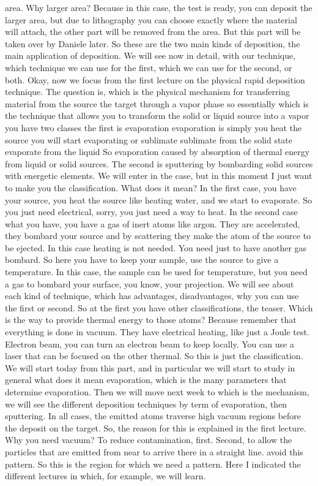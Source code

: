 area. Why larger area? Because in this case, the test is ready, you can deposit the larger area, but due to lithography you can choose exactly where the material will attach, the other part will be removed from the area. But this part will be taken over by Daniele later. So these are the two main kinds of deposition, the main application of deposition. We will see now in detail, with our technique, which technique we can use for the first, which we can use for the second, or both.
Okay, now we focus from the first lecture on the physical rapid deposition technique. The question is, which is the physical mechanism for transferring material from the source the target through a vapor phase so essentially which is the technique that allows you to transform the solid or liquid source into a vapor you have two classes the first is evaporation evaporation is simply you heat the source you will start evaporating or sublimate sublimate from the solid state evaporate from the liquid So evaporation caused by absorption of thermal energy from liquid or solid sources. The second is sputtering by bombarding solid sources with energetic elements. We will enter in the case, but in this moment I just want to make you the classification. What does it mean? In the first case, you have your source, you heat the source like heating water, and we start to evaporate. So you just need electrical, sorry, you just need a way to heat. In the second case what you have, you have a gas of inert atoms like argon. They are accelerated, they bombard your source and by scattering they make the atom of the source to be ejected. In this case heating is not needed. You need just to have another gas bombard. So here you have to keep your sample, use the source to give a temperature. In this case, the sample can be used for temperature, but you need a gas to bombard your surface, you know, your projection. We will see about each kind of technique, which has advantages, disadvantages, why you can use the first or second. So at the first you have other classifications, the teaser. Which is the way to provide thermal energy to those atoms? Because remember that everything is done in vacuum. They have electrical heating, like just a Joule test. Electron beam, you can turn an electron beam to keep locally. You can use a laser that can be focused on the other thermal. So this is just the classification. We will start today from this part, and in particular we will start to study in general what does it mean evaporation, which is the many parameters that determine evaporation. Then we will move next week to which is the mechanism, we will see the different deposition techniques by term of evaporation, then sputtering. In all cases, the emitted atoms traverse high vacuum regions before the deposit on the target. So, the reason for this is explained in the first lecture. Why you need vacuum? To reduce contamination, first. Second, to allow the particles that are emitted from near to arrive there in a straight line. avoid this pattern. So this is the region for which we need a pattern. Here I indicated the different lectures in which, for example, we will learn.

